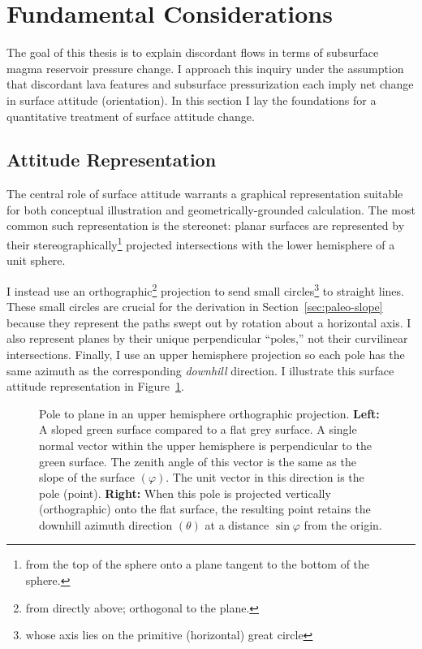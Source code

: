 \section{Fundamental Considerations}\label{sec:considerations}

The goal of this thesis is to explain discordant flows in terms of subsurface magma reservoir pressure change. I approach this inquiry under the assumption that discordant lava features and subsurface pressurization each imply net change in surface attitude (orientation). In this section I lay the foundations for a quantitative treatment of surface attitude change.

\subsection{Attitude Representation}

The central role of surface attitude warrants a graphical representation suitable for both conceptual illustration and geometrically-grounded calculation. The most common such representation is the stereonet: planar surfaces are represented by their stereographically\footnote{from the top of the sphere onto a plane tangent to the bottom of the sphere.} projected intersections with the lower hemisphere of a unit sphere.

I instead use an orthographic\footnote{from directly above; orthogonal to the plane.} projection to send small circles\footnote{whose axis lies on the primitive (horizontal) great circle} to straight lines. These small circles are crucial for the derivation in Section~\ref{sec:paleo-slope} because they represent the paths swept out by rotation about a horizontal axis. I also represent planes by their unique perpendicular ``poles,'' not their curvilinear intersections. Finally, I use an upper hemisphere projection so each pole has the same azimuth as the corresponding \emph{downhill} direction. I illustrate this surface attitude representation in Figure~\ref{fig:surface}.


\begin{figure}
    \caption[Orthographic pole to plane]{Pole to plane in an upper hemisphere orthographic projection. \textbf{Left:} A sloped green surface compared to a flat grey surface. A single normal vector within the upper hemisphere is perpendicular to the green surface. The zenith angle of this vector is the same as the slope of the surface $(\varphi)$. The unit vector in this direction is the pole (point). \textbf{Right:} When this pole is projected vertically (orthographic) onto the flat surface, the resulting point retains the downhill azimuth direction $(\theta)$ at a distance $\sin\varphi$ from the origin.}%
    \label{fig:surface}%
\end{figure}

